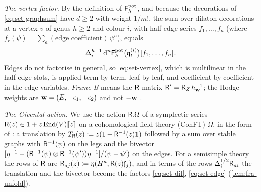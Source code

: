 \emph{The vertex factor.} By the definition of $\mathsf{F}^{\mathrm{pot}}_h$, and because the decorations of \eqref{eq:set-graphsum} have $d\geq2$ with weight $1/m!$, the sum over dilaton decorations at a vertex $v$ of genus $h\geq2$ and colour $i$, with half-edge series $f_1,\ldots,f_n$ (where $f_r(\psi)=\sum_a(\text{edge coefficient})\,\psi^a$), equals
\begin{equation}
\label{eq:set-vertex}
\Delta_i^{h-1}\,\mathrm{d}^n\mathsf{F}^{\mathrm{pot}}_h\big(\mathsf{q}_{t}^{(i)}\big)[f_1,\ldots,f_n].
\end{equation}
Edges do not factorise in general, so \eqref{eq:set-vertex}, which is multilinear in the half-edge slots, is applied term by term, leaf by leaf, and coefficient by coefficient in the edge variables. \emph{Frame B} means the $\mathsf{R}$-matrix $\mathsf{R}'=\mathsf{R}_Z\,h_{\mathbf{w}}^{-1}$; the Hodge weights are $\mathbf{w}=(E,-\epsilon_1,-\epsilon_2)$ and not $-\mathbf{w}$ .

\emph{The Givental action.} We use the action $\mathsf{R}.\Omega$ of a symplectic series $\mathsf{R}(z)\in1+z\operatorname{End}(V)[\![ z ]\!]$ on a cohomological field theory (CohFT) $\Omega$, in the form of \cite[Definitions~2.2, 2.5, 2.13 and Proposition~2.14]{PPZ15}: a translation by $T_{\mathsf{R}}(z)\coloneqq z(1-\mathsf{R}^{-1}(z)\mathbf{1})$ followed by a sum over stable graphs with $\mathsf{R}^{-1}(\psi)$ on the legs and the bivector $[\eta^{-1}-(\mathsf{R}^{-1}(\psi)\otimes\mathsf{R}^{-1}(\psi'))\eta^{-1}]/(\psi+\psi')$ on the edges. For a semisimple theory the rows of $\mathsf{R}$ are $\mathsf{R}_{aj}(z)\coloneqq\eta(H^a,\mathsf{R}(z)\mathfrak{f}_j)$, and in terms of the rows $\Delta_i^{1/2}\mathsf{R}_{ai}$ the translation and the bivector become the factors \eqref{eq:set-dil}, \eqref{eq:set-edge} (\cref{lem:fra-unfold}).
